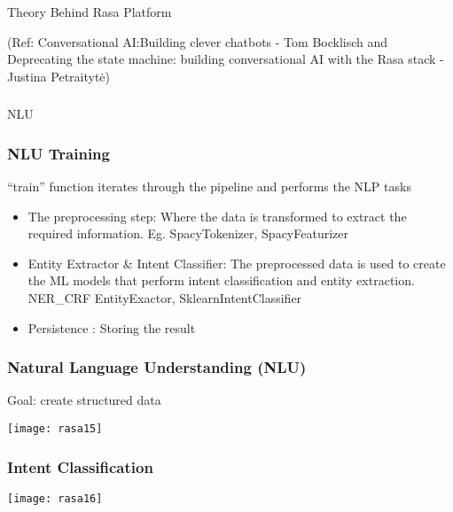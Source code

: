 \begin{frame}[fragile]\frametitle{}
\begin{center}
{\Large Theory Behind Rasa Platform}

{\tiny (Ref: Conversational AI:Building clever chatbots - Tom Bocklisch and Deprecating the state machine: building conversational AI with the Rasa stack - Justina Petraitytė) }

\end{center}
\end{frame}

\begin{frame}[fragile]\frametitle{}
\begin{center}
{\Large NLU}

\end{center}
\end{frame}

 \begin{frame}[fragile]\frametitle{NLU Training}
 ``train'' function iterates through the pipeline and performs the NLP tasks
\begin{itemize}
\item The preprocessing step: Where the data is transformed to extract the required information. Eg. SpacyTokenizer, SpacyFeaturizer
\item Entity Extractor \& Intent Classifier: The preprocessed data is used to create the ML models that perform intent classification and entity extraction. NER\_CRF EntityExactor, SklearnIntentClassifier
\item Persistence : Storing the result
\end{itemize}
\end{frame}

\begin{frame}[fragile]\frametitle{Natural Language Understanding (NLU)}

Goal: create structured data

\begin{center}
\texttt{[image: rasa15]}
\end{center}


\end{frame}


\begin{frame}[fragile]\frametitle{Intent Classification}

\begin{center}
\texttt{[image: rasa16]}
\end{center}


\end{frame}

